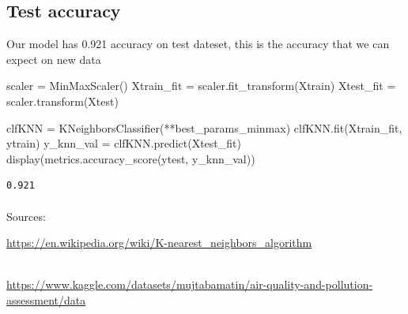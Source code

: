 \documentclass[
  letterpaper,
  DIV=11,
  numbers=noendperiod]{scrartcl}
\makeatletter
\let\oldparagraph\paragraph
\renewcommand{\paragraph}{
    \@ifstar
      \xxxParagraphStar
      \xxxParagraphNoStar
  }
\newcommand{\xxxParagraphStar}[1]{\oldparagraph*{#1}\mbox{}}
\newcommand{\xxxParagraphNoStar}[1]{\oldparagraph{#1}\mbox{}}
\newenvironment{Shaded}{\begin{snugshade}}{\end{snugshade}}
\newcommand{\NormalTok}[1]{\textcolor[rgb]{0.00,0.23,0.31}{#1}}
\newcommand{\OperatorTok}[1]{\textcolor[rgb]{0.37,0.37,0.37}{#1}}
\makeatother
\begin{document}
\subsection{Test accuracy}\label{test-accuracy}

Our model has 0.921 accuracy on test dateset, this is the accuracy that
we can expect on new data

\begin{Shaded}
\begin{Highlighting}[]
\NormalTok{scaler }\OperatorTok{=}\NormalTok{ MinMaxScaler()}
\NormalTok{Xtrain\_fit }\OperatorTok{=}\NormalTok{ scaler.fit\_transform(Xtrain)}
\NormalTok{Xtest\_fit }\OperatorTok{=}\NormalTok{ scaler.transform(Xtest)}

\NormalTok{clfKNN }\OperatorTok{=}\NormalTok{ KNeighborsClassifier(}\OperatorTok{**}\NormalTok{best\_params\_minmax)}
\NormalTok{clfKNN.fit(Xtrain\_fit, ytrain)}
\NormalTok{y\_knn\_val }\OperatorTok{=}\NormalTok{ clfKNN.predict(Xtest\_fit)}
\NormalTok{display(metrics.accuracy\_score(ytest, y\_knn\_val))}
\end{Highlighting}
\end{Shaded}

\begin{verbatim}
0.921
\end{verbatim}

\paragraph{Sources:}\label{sources}

\url{https://en.wikipedia.org/wiki/K-nearest_neighbors_algorithm}\strut \\
\url{https://www.kaggle.com/datasets/mujtabamatin/air-quality-and-pollution-assessment/data}
\end{document}
